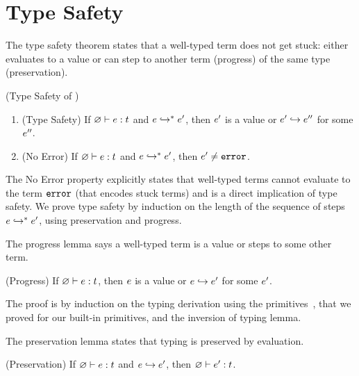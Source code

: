 \section{Type Safety}
\label{sec:soundness:safety}

The type safety theorem  states that a well-typed 
term does not get stuck: \ie either 
evaluates to a value or can step 
to another term (progress) 
of the same type (preservation).
%

\begin{theorem} (Type Safety of \sysrf) 
\label{lem:soundness} 
\begin{enumerate}
    \item (Type Safety)
    If ${\varnothing} \vdash {\ensuremath{e}} : {t}$ and ${e} \hookrightarrow^{*} {e'}$,
    then $e'$ is a value or $e' \hookrightarrow e''$
    for some $e''$.
    \item (No Error)
    If ${\varnothing} \vdash {\ensuremath{e}} : {t}$ and ${e} \hookrightarrow^{*} {e'}$,
    then $e' \not = \texttt{error}$.
\end{enumerate}
\end{theorem}
The No Error property explicitly states that well-typed terms 
cannot evaluate to the term $\texttt{error}$ (that encodes stuck terms)
and is a direct implication of type safety.
We prove type safety by induction on the 
length of the sequence of steps  
${e} \hookrightarrow^{*} {e'}$, using  
preservation and progress.

 \label{sec:sysf:progress}
%
The progress lemma says a well-typed term is a value 
or steps to some other term.
%
\begin{lemma} (Progress) \label{lem:progressF} 
If ${\varnothing} \vdash {\ensuremath{e}} : {t}$, 
then $e$ is a value or $e \hookrightarrow e'$ for some $e'$.
\end{lemma}

The proof is by induction on the typing derivation 
using the primitives~, that we proved 
for our built-in primitives, and the inversion of typing lemma.



 \label{sec:sysf:preservation}
%
The preservation lemma states that typing is preserved
by evaluation.
%
\begin{lemma} (Preservation) \label{lem:preservationF} 
If ${\varnothing} \vdash {\ensuremath{e}} : {t}$ and $e \hookrightarrow e'$, 
then $\hastype{\varnothing}{\sexpr'}{\stype}$.
\end{lemma}    

